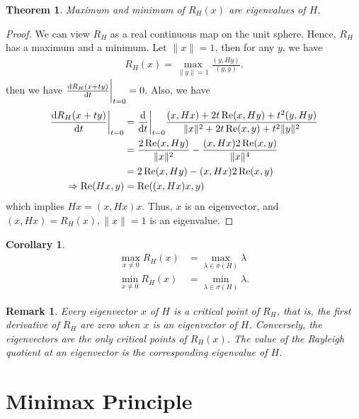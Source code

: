 \documentclass[11pt]{book}
\newtheorem{theorem}{Theorem}[section]
\newtheorem{corollary}{Corollary}[section]
\newtheorem{remark}{Remark}[section]
\theoremstyle{definition}
\numberwithin{equation}{subsection}
\begin{document}
\begin{theorem}
Maximum and minimum of $R_H(x)$ are eigenvalues of $H$.
\end{theorem}
\begin{proof}
We can view $R_H$ as a real continuous map on the unit sphere. Hence, $R_H$ has a maximum and a minimum. Let $\|x\|=1$, then for any $y$, we have 
\begin{align*}
    R_H(x) = \max_{\|y\|=1} \frac{(y,Hy)}{(y,y)}.
\end{align*}
then we have $\dv{R_H(x+ty)}{t}\bigg|_{t = 0} = 0$. Also, we have
\begin{align*}
    \dv{R_H(x+ty)}{t}\bigg|_{t = 0} & = \dv{}{t}\bigg|_{t = 0} \frac{(x,Hx) + 2t\Re (x,Hy) + t^2 (y,Hy)}{\|x\|^2 + 2t \Re (x,y) + t^2 \|y\|^2} \\
    & = \frac{2\Re (x,Hy)}{\|x\|^2} - \frac{(x,Hx) 2 \Re (x,y)}{\|x\|^4} \\
    & = 2\Re (x,Hy) - (x,Hx) 2 \Re (x,y) \\
    \Rightarrow \Re (Hx,y) & =  \Re ((x,Hx)x,y)
\end{align*}
which implies $Hx = (x,Hx)x$. Thus, $x$ is an eigenvector, and $(x,Hx) = R_H(x), \|x\|=1$ is an eigenvalue.
\end{proof}

\medskip

\begin{corollary}
\begin{align*}
    \max_{x\neq 0}R_H(x) & = \max_{\lambda\in \sigma(H)}\lambda \\
    \min_{x\neq 0}R_H(x) & = \min_{\lambda\in \sigma(H)}\lambda.
\end{align*}
\end{corollary}

\begin{remark}
Every eigenvector $x$ of $H$ is a critical point of $R_H$, that is, the first derivative of $R_H$ are zero when $x$ is an eigenvector of $H$. Conversely, the eigenvectors are the only critical points of $R_H(x)$. The value of the Rayleigh quotient at an eigenvector is the corresponding eigenvalue of $H$.
\end{remark}

\medskip

\section{Minimax Principle}
\end{document}
